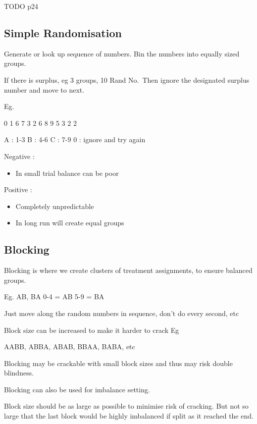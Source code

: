 \documentclass[
  letterpaper,
  DIV=11,
  numbers=noendperiod]{scrreprt}
\providecommand{\tightlist}{%
  \setlength{\itemsep}{0pt}\setlength{\parskip}{0pt}}\usepackage{longtable,booktabs,array}
\begin{document}
TODO p24

\hypertarget{simple-randomisation}{%
\subsection{Simple Randomisation}\label{simple-randomisation}}

Generate or look up sequence of numbers. Bin the numbers into equally
sized groups.

If there is surplus, eg 3 groups, 10 Rand No.~Then ignore the designated
surplus number and move to next.

Eg.

0 1 6 7 3 2 6 8 9 5 3 2 2

A : 1-3 B : 4-6 C : 7-9 0 : ignore and try again

Negative :

\begin{itemize}
\tightlist
\item
  In small trial balance can be poor
\end{itemize}

Positive :

\begin{itemize}
\tightlist
\item
  Completely unpredictable
\item
  In long run will create equal groups
\end{itemize}

\hypertarget{blocking}{%
\subsection{Blocking}\label{blocking}}

Blocking is where we create clusters of treatment assignments, to ensure
balanced groups.

Eg. AB, BA 0-4 = AB 5-9 = BA

Just move along the random numbers in sequence, don't do every second,
etc

Block size can be increased to make it harder to crack Eg

AABB, ABBA, ABAB, BBAA, BABA, etc

Blocking may be crackable with small block sizes and thus may risk
double blindness.

Blocking can also be used for imbalance setting.

Block size should be as large as possible to minimise risk of cracking.
But not so large that the last block would be highly imbalanced if split
as it reached the end.
\end{document}
